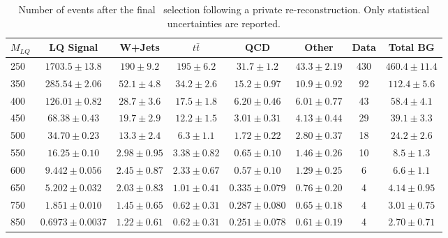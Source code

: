 \begin{table} 
  \small 
  \begin{tabular}{l | c | c | c | c | c | c | c} 
    $M_{LQ}$ & LQ Signal & W+Jets & $t\bar{t}$ & QCD & Other & Data &  Total BG \\ 
    \hline 
    \hline 
    250    & $ 1703.5 \pm 13.8 $   &  $ 190  \pm 9.2  $ & $ 195  \pm 6.2  $ & $ 31.7  \pm 1.2  $  & $ 43.3 \pm 2.19 $ &430 & $ 460.4 \pm 11.4 $ \\ 
    350    & $ 285.54 \pm 2.06 $   &  $ 52.1 \pm 4.8  $ & $ 34.2 \pm 2.6  $ & $ 15.2  \pm 0.97 $  & $ 10.9 \pm 0.92 $ &92 & $ 112.4 \pm 5.6 $ \\ 
    400    & $ 126.01 \pm 0.82 $   &  $ 28.7 \pm 3.6  $ & $ 17.5 \pm 1.8  $ & $ 6.20  \pm 0.46 $  & $ 6.01 \pm 0.77 $ &43 & $ 58.4 \pm 4.1 $ \\ 
    450    & $ 68.38 \pm 0.43 $    &  $ 19.7 \pm 2.9  $ & $ 12.2 \pm 1.5  $ & $ 3.01  \pm 0.31 $  & $ 4.13 \pm 0.44 $ &29 & $ 39.1 \pm 3.3 $ \\ 
    500    & $ 34.70 \pm 0.23 $    &  $ 13.3 \pm 2.4  $ & $ 6.3  \pm 1.1  $ & $ 1.72  \pm 0.22 $  & $ 2.80 \pm 0.37 $ &18 & $ 24.2 \pm 2.6 $ \\ 
    550    & $ 16.25 \pm 0.10 $    &  $ 2.98 \pm 0.95 $ & $ 3.38 \pm 0.82 $ & $ 0.65  \pm 0.10 $  & $ 1.46 \pm 0.26 $ &10 & $ 8.5 \pm 1.3 $ \\ 
    600    & $ 9.442 \pm 0.056 $   &  $ 2.45 \pm 0.87 $ & $ 2.33 \pm 0.67 $ & $ 0.57  \pm 0.10 $  & $ 1.29 \pm 0.25 $ &6 & $ 6.6 \pm 1.1 $ \\ 
    650    & $ 5.202 \pm 0.032 $   &  $ 2.03 \pm 0.83 $ & $ 1.01 \pm 0.41 $ & $ 0.335 \pm 0.079 $ & $ 0.76 \pm 0.20 $ &4 & $ 4.14 \pm 0.95 $ \\ 
    750    & $ 1.851 \pm 0.010 $   &  $ 1.45 \pm 0.65 $ & $ 0.62 \pm 0.31 $ & $ 0.287 \pm 0.080 $ & $ 0.65 \pm 0.18 $ &4 & $ 3.01 \pm 0.75 $ \\ 
    850    & $ 0.6973 \pm 0.0037 $ &  $ 1.22 \pm 0.61 $ & $ 0.62 \pm 0.31 $ & $ 0.251 \pm 0.078 $ & $ 0.61 \pm 0.19 $ &4 & $ 2.70 \pm 0.71 $ \\ 
  \end{tabular}
  \caption{Number of events after the final \enujj~selection following a private re-reconstruction. 
    Only statistical uncertainties are reported.}
  \label{tab:enujjFinalSelection_Nov30}
\end{table}

